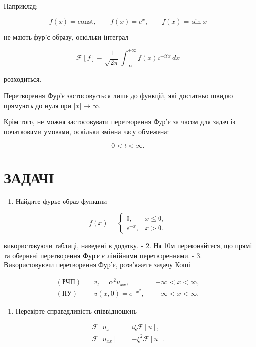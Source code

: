 \documentclass[
  ukrainian,
]{article}
\providecommand{\tightlist}{%
  \setlength{\itemsep}{0pt}\setlength{\parskip}{0pt}}
\begin{document}
Наприклад:

\[
f(x)=\text{const}, \qquad f(x)=e^x, \qquad f(x)=\sin x
\]

не мають фур'є-образу, оскільки інтеграл

\[
\mathcal{F}[f] = \frac{1}{\sqrt{2\pi}} \int_{-\infty}^{+\infty} f(x)e^{-i\xi x}\,dx
\]

розходиться.

Перетворення Фур'є застосовується лише до функцій, які достатньо швидко
прямують до нуля при \(|x|\to\infty\).

Крім того, не можна застосовувати перетворення Фур'є за часом для задач
із початковими умовами, оскільки змінна часу обмежена:

\[
0 < t < \infty.
\]

\section{ЗАДАЧІ}\label{ux437ux430ux434ux430ux447ux456-1}

\begin{enumerate}
\def\labelenumi{\arabic{enumi}.}
\tightlist
\item
  Найдите фурье-образ функции
\end{enumerate}

\[
f(x)=
\begin{cases}
0, & x \le 0, \\
e^{-x}, & x > 0.
\end{cases}
\]

використовуючи таблиці, наведені в додатку. - 2. На 10м переконайтеся,
що прямі та обернені перетворення Фур'є є лінійними перетвореннями. - 3.
Використовуючи перетворення Фур'є, розв'яжете задачу Коші

\[
\begin{aligned}
(\text{РЧП})\quad & u_t = \alpha^2 u_{xx}, && -\infty < x < \infty,\\
(\text{ПУ})\quad & u(x,0)=e^{-x^2}, && -\infty < x < \infty.
\end{aligned}
\]

\begin{enumerate}
\def\labelenumi{\arabic{enumi}.}
\setcounter{enumi}{3}
\tightlist
\item
  Перевірте справедливість співвідношень
\end{enumerate}

\[
\begin{aligned}
\mathcal{F}\left[u_{x}\right] &= i\xi \mathcal{F}\left[u\right], \\
\mathcal{F}\left[u_{xx}\right] &= -\xi^{2} \mathcal{F}\left[u\right].
\end{aligned}
\]
\end{document}
